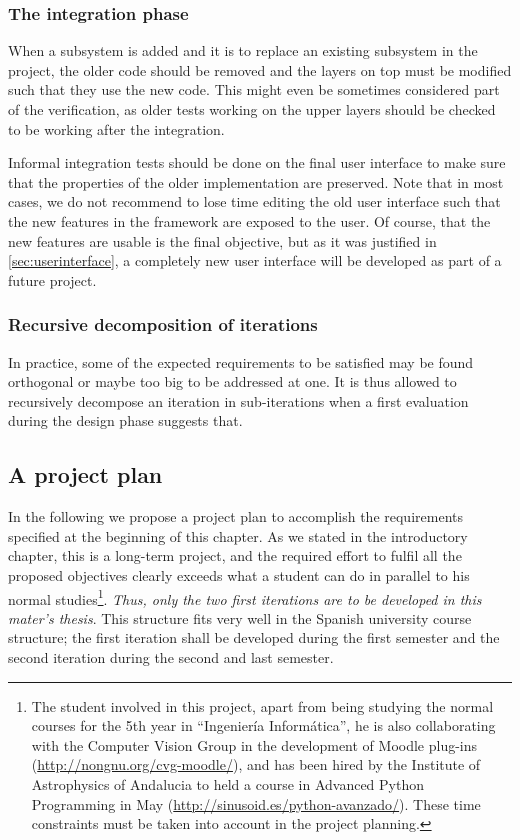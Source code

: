\subsubsection{The integration phase}

When a subsystem is added and it is to replace an
existing subsystem in the project, the older code should be removed
and the layers on top must be modified such that they use the new
code. This might even be sometimes considered part of the
verification, as older tests working on the upper layers should be
checked to be working after the integration.

Informal integration tests should be done on the final user interface
to make sure that the properties of the older implementation are
preserved. Note that in most cases, we do not recommend to lose time
editing the old user interface such that the new features in the
framework are exposed to the user. Of course, that the new features
are usable is the final objective, but as it was justified in
\ref{sec:userinterface}, a completely new user interface will be
developed as part of a future project.

\subsubsection{Recursive decomposition of iterations}

In practice, some of the expected requirements to be satisfied may be
found orthogonal or maybe too big to be addressed at one. It is thus
allowed to recursively decompose an iteration in sub-iterations when a
first evaluation during the design phase suggests that.

\subsection{A project plan}

In the following we propose a project plan to accomplish the
requirements specified at the beginning of this chapter. As we stated
in the introductory chapter, this is a long-term project, and the
required effort to fulfil all the proposed objectives clearly exceeds
what a student can do in parallel to his normal studies\footnote{The
  student involved in this project, apart from being studying the
  normal courses for the 5th year in ``Ingeniería Informática'', he is
  also collaborating with the Computer Vision Group in the development
  of Moodle plug-ins (\url{http://nongnu.org/cvg-moodle/}), and has
  been hired by the Institute of Astrophysics of Andalucia to held a
  course in Advanced Python Programming in May
  (\url{http://sinusoid.es/python-avanzado/}). These time constraints
  must be taken into account in the project planning.}. \emph{Thus,
  only the two first iterations are to be developed in this mater's
  thesis}. This structure fits very well in the Spanish university
course structure; the first iteration shall be developed during the
first semester and the second iteration during the second and last
semester.

